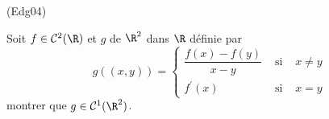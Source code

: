 \begin{tiny}(Edg04)\end{tiny}
Soit $f\in \mathcal{C}^{2}(\R)$ et $g$ de $\R^{2}$
dans $\R$ d{\'e}finie par
\begin{displaymath}
g((x,y))=\left\{
\begin{aligned}
\dfrac{f(x)-f(y)}{x-y} & \text{ si } & x\neq y \\
f^{\prime }(x) & \text{ si } & x=y
\end{aligned}
\right. 
\end{displaymath}
montrer que $g\in \mathcal{C}^{1}(\R^{2})$.